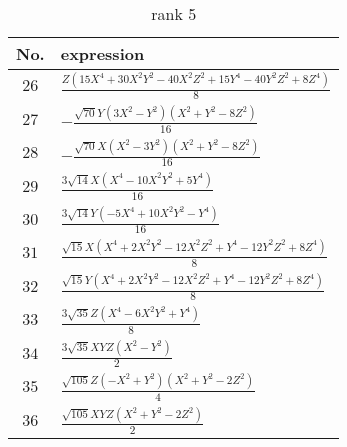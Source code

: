 \documentclass[fleqn,8pt,landscape]{jsarticle}
\begin{document}
\begin{table}[ht!]
\begin{center}
\caption{rank 5}
\renewcommand{\arraystretch}{1.3}
\begin{tabular}{cl} \hline \hline
No. & expression \\ \hline
$ 26 $ & $ \frac{Z \left(15 X^{4} + 30 X^{2} Y^{2} - 40 X^{2} Z^{2} + 15 Y^{4} - 40 Y^{2} Z^{2} + 8 Z^{4}\right)}{8} $ \\
$ 27 $ & $ - \frac{\sqrt{70} Y \left(3 X^{2} - Y^{2}\right) \left(X^{2} + Y^{2} - 8 Z^{2}\right)}{16} $ \\
$ 28 $ & $ - \frac{\sqrt{70} X \left(X^{2} - 3 Y^{2}\right) \left(X^{2} + Y^{2} - 8 Z^{2}\right)}{16} $ \\
$ 29 $ & $ \frac{3 \sqrt{14} X \left(X^{4} - 10 X^{2} Y^{2} + 5 Y^{4}\right)}{16} $ \\
$ 30 $ & $ \frac{3 \sqrt{14} Y \left(- 5 X^{4} + 10 X^{2} Y^{2} - Y^{4}\right)}{16} $ \\
$ 31 $ & $ \frac{\sqrt{15} X \left(X^{4} + 2 X^{2} Y^{2} - 12 X^{2} Z^{2} + Y^{4} - 12 Y^{2} Z^{2} + 8 Z^{4}\right)}{8} $ \\
$ 32 $ & $ \frac{\sqrt{15} Y \left(X^{4} + 2 X^{2} Y^{2} - 12 X^{2} Z^{2} + Y^{4} - 12 Y^{2} Z^{2} + 8 Z^{4}\right)}{8} $ \\
$ 33 $ & $ \frac{3 \sqrt{35} Z \left(X^{4} - 6 X^{2} Y^{2} + Y^{4}\right)}{8} $ \\
$ 34 $ & $ \frac{3 \sqrt{35} X Y Z \left(X^{2} - Y^{2}\right)}{2} $ \\
$ 35 $ & $ \frac{\sqrt{105} Z \left(- X^{2} + Y^{2}\right) \left(X^{2} + Y^{2} - 2 Z^{2}\right)}{4} $ \\
$ 36 $ & $ \frac{\sqrt{105} X Y Z \left(X^{2} + Y^{2} - 2 Z^{2}\right)}{2} $ \\
 \hline \hline
\end{tabular}
\end{center}
\end{table}
\end{document}
